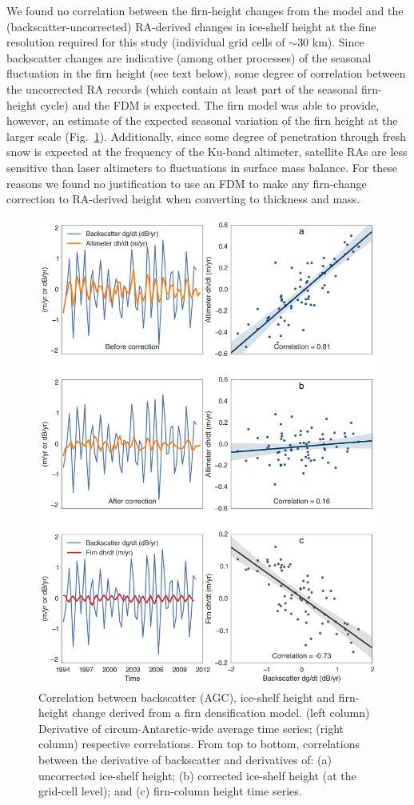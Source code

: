 We found no correlation between the firn-height changes from the model and the (backscatter-uncorrected) RA-derived changes in ice-shelf height at the fine resolution required for this study (individual grid cells of $\sim$30 km). Since backscatter changes are indicative (among other processes) of the seasonal fluctuation in the firn height (see text below), some degree of correlation between the uncorrected RA records (which contain at least part of the seasonal firn-height cycle) and the FDM is expected. The firn model was able to provide, however, an estimate of the expected seasonal variation of the firn height at the larger scale (Fig.~\ref{c2f5}). Additionally, since some degree of penetration through fresh snow is expected at the frequency of the Ku-band altimeter, satellite RAs are less sensitive than laser altimeters to fluctuations in surface mass balance. For these reasons we found no justification to use an FDM to make any firn-change correction to RA-derived height when converting to thickness and mass.


\begin{figure}[!ht]
  \centering
  \vspace{.4cm}
  \includegraphics[width=.85\textwidth]{img/correlation_h_b_f_v7.png}
  \caption[Correlation between backscatter (AGC), ice-shelf height]{
  \ssp \footnotesize
  Correlation between backscatter (AGC), ice-shelf height and firn-height change derived from a firn densification model. (left column) Derivative of circum-Antarctic-wide average time series; (right column) respective correlations. From top to bottom, correlations between the derivative of backscatter and derivatives of: (a) uncorrected ice-shelf height; (b) corrected ice-shelf height (at the grid-cell level); and (c) firn-column height time series.
  } 
  \label{c2f5}
\end{figure}

